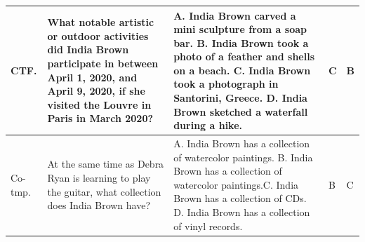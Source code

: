 \documentclass{article} %
\begin{document}
\begin{table}[t!]
\begin{tabular}{@{}p{1cm} p{3.0cm} p{5cm} m{2cm} m{1.5cm}@{}}
\midrule
CTF. & What notable artistic or outdoor activities did India Brown participate in between April 1, 2020, and April 9, 2020, if she visited the Louvre in Paris in March 2020? & A. India Brown carved a mini sculpture from a soap bar. \newline B. India Brown took a photo of a feather and shells on a beach. \newline C. India Brown took a photograph in Santorini, Greece. \newline D. India Brown sketched a waterfall during a hike. & C & B \\
\midrule
Co-tmp. & At the same time as Debra Ryan is learning to play the guitar, what collection does India Brown have? & A. India Brown has a collection of watercolor paintings. \newline B. India Brown has a collection of watercolor paintings.\newline C. India Brown has a collection of CDs. \newline D. India Brown has a collection of vinyl records. & B & C \\
\bottomrule
\end{tabular}
\end{table}
\end{document}
